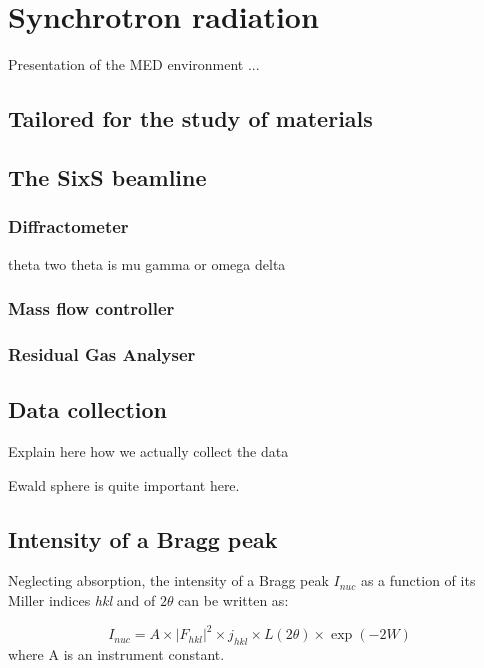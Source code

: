 \section{Synchrotron radiation}

Presentation of the MED environment ... 

\subsection{Tailored for the study of materials}

\subsection{The SixS beamline}

\subsubsection{Diffractometer}
theta two theta is mu gamma or omega delta

\subsubsection{Mass flow controller}

\subsubsection{Residual Gas Analyser}


\subsection{Data collection}

Explain here how we actually collect the data

Ewald sphere is quite important here.

\subsection{Intensity of a Bragg peak}
Neglecting absorption, the intensity of a Bragg peak $I_{nuc}$ as a function of its Miller indices \textit{hkl} and of $2\theta$ can be written as:

\begin{equation}
    \label{eq:PeakIntensity}
    I_{nuc} = A \times |F_{hkl}|^2  \times j_{hkl} \times L(2\theta) \times \exp{(-2W)}
\end{equation}
where A is an instrument constant.

